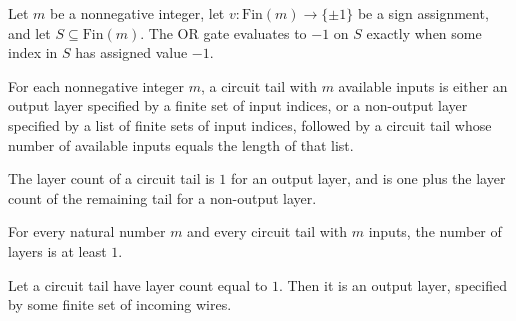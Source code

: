 \begin{theorem}
\label{FABL.CircuitGate.evalFinset_or_eq_neg_one_iff}
\leanok
{}
Let $m$ be a nonnegative integer, let $v:\text{Fin}(m)\to\{\pm1\}$ be a sign assignment,
and let $S\subseteq\text{Fin}(m)$. The OR gate evaluates to $-1$ on $S$ exactly when
some index in $S$ has assigned value $-1$.
\end{theorem}

\begin{definition}
\label{FABL.CircuitTail}
\leanok
For each nonnegative integer $m$, a circuit tail with $m$ available inputs is either an
output layer specified by a finite set of input indices, or a non-output layer specified
by a list of finite sets of input indices, followed by a circuit tail whose number of
available inputs equals the length of that list.
\end{definition}

\begin{definition}
\label{FABL.CircuitTail.layerCount}
\leanok
{}
The layer count of a circuit tail is $1$ for an output layer, and is one plus the layer
count of the remaining tail for a non-output layer.
\end{definition}

\begin{theorem}
\label{FABL.CircuitTail.one_le_layerCount}
\leanok
{}
For every natural number $m$ and every circuit tail with $m$ inputs, the number of
layers is at least $1$.
\end{theorem}

\begin{theorem}
\label{FABL.CircuitTail.eq_output_of_layerCount_eq_one}
\leanok
{}
Let a circuit tail have layer count equal to $1$. Then it is an output layer, specified
by some finite set of incoming wires.
\end{theorem}

